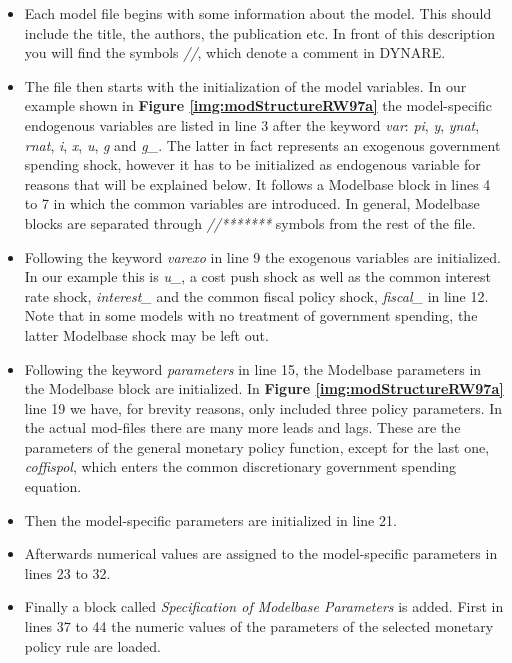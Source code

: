 \begin{itemize}
    \item Each model file begins with some information about the model. This should include the
    title, the authors, the publication etc. In front
    of this description you will find the symbols \textit{//}, which denote a comment in DYNARE.
    \item The file then starts with the initialization of the model variables. In our example shown in {\bf Figure
    \ref{img:modStructureRW97a}} the model-specific endogenous variables are listed in line 3 after the keyword \textit{var}:
    \textit{pi}, \textit{y}, \textit{ynat}, \textit{rnat}, \textit{i}, \textit{x}, \textit{u}, \textit{g}
    and \textit{g\_}. The latter in fact represents an exogenous government spending shock, however it has to be
    initialized as endogenous variable for reasons that will be explained below.
    It follows a Modelbase block in lines 4 to 7 in which the common variables are introduced.
    In general, Modelbase blocks are separated through \textit{//*******} symbols from the rest of the file.
    \item Following the keyword \textit{varexo} in line 9 the exogenous variables are initialized.
    In our example this is \textit{u\_}, a cost push shock as well as the common interest rate shock, \textit{interest\_} and
    the common fiscal policy shock, \textit{fiscal\_} in line 12. Note that in some models with no treatment of government spending, the
    latter Modelbase shock may be left out.
    \item Following the keyword \textit{parameters} in line 15, the Modelbase parameters in the Modelbase block are initialized.
    In {\bf Figure \ref{img:modStructureRW97a}} line 19 we have, for brevity reasons, only included three policy parameters.
    In the actual mod-files there are many more leads and lags. These are the parameters of the
    general monetary policy function, except for the last one, \textit{coffispol},
    which enters the common discretionary government spending equation.
    \item Then the model-specific parameters are initialized in line 21.
    \item Afterwards numerical values are assigned to the model-specific parameters in lines 23 to 32.
    \item Finally a block called \textit{Specification of Modelbase Parameters} is added. First in lines 37 to 44 the numeric
    values of the parameters of the selected monetary policy rule are loaded.

\end{itemize}
